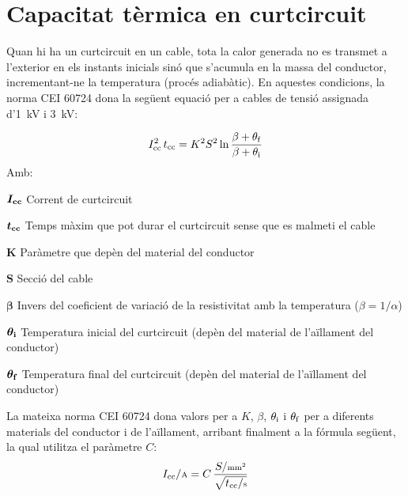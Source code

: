 \section{Capacitat tèrmica en curtcircuit}\label{ces:cables_Icc_termica}

Quan hi ha un curtcircuit en un cable, tota la calor generada no es transmet a l'exterior en els instants inicials sinó que s'acumula en la massa del conductor, incrementant-ne la temperatura (procés adiabàtic). En aquestes condicions, la norma CEI 60724 dona la següent equació per a cables de tensió assignada d'\SI{1}{kV} i \SI{3}{kV}:

\begin{equation}
   I\ped{cc}^2 \,t\ped{cc} = K^2 S^2 \ln \frac{\beta + \theta\ped{f}}{\beta + \theta\ped{i}}
\end{equation}
Amb:

\begin{list}{}
   {\setlength{\labelwidth}{10mm} \setlength{\leftmargin}{12mm} \setlength{\labelsep}{2mm}}
   \item[\hspace{5mm}$\boldsymbol{I\ped{cc}}$\hfill] Corrent de curtcircuit
   \item[\hspace{5mm}$\boldsymbol{t\ped{cc}}$\hfill] Temps màxim que pot durar el curtcircuit sense que es malmeti el cable
   \item[\hspace{5mm}$\boldsymbol{K}$\hfill] Paràmetre que depèn del material del conductor
   \item[\hspace{5mm}$\boldsymbol{S}$\hfill] Secció del cable
   \item[\hspace{5mm}$\boldsymbol{\beta}$\hfill] Invers del coeficient de variació de la resistivitat amb la temperatura ($\beta = 1/ \alpha$)
   \item[\hspace{5mm}$\boldsymbol{\theta\ped{i}}$\hfill] Temperatura inicial del curtcircuit (depèn del material de l'aïllament del conductor)
   \item[\hspace{5mm}$\boldsymbol{\theta\ped{f}}$\hfill] Temperatura final del curtcircuit (depèn del material de l'aïllament del conductor)
\end{list}

La mateixa norma CEI 60724 dona valors per a $K$, $\beta$, $\theta\ped{i}$ i $\theta\ped{f}$ per a diferents materials del conductor i de l'aïllament, arribant finalment a la fórmula següent, la qual utilitza el paràmetre $C$:
\begin{equation}\label{eq:Icc_termica}
   I\ped{cc}/{\scriptstyle\si{A}} = C\, \frac{S/{\scriptstyle\si{mm^2}}}{\sqrt{t\ped{cc}/{\scriptstyle\si{s}}}}
\end{equation}


